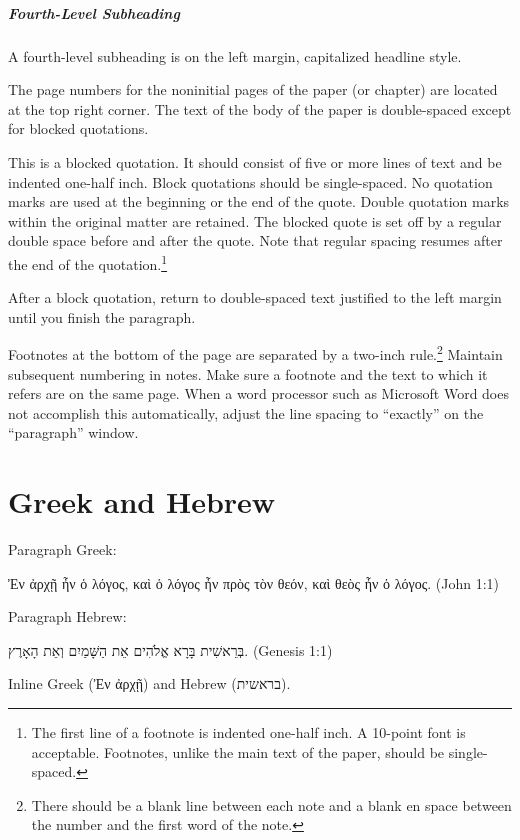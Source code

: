 \documentclass[letterpaper,12pt,oneside,openany]{book}
\begin{document}
\subparagraph{Fourth-Level Subheading}

A fourth-level subheading is on the left margin, capitalized headline style.

The page numbers for the noninitial pages of the paper (or chapter) are
located at the top right corner. The text of the body of the paper is
double-spaced except for blocked
quotations.
\begin{quoting}
  This is a blocked quotation. It should consist of five or more lines of text
  and be indented one-half inch. Block quotations should be single-spaced. No
  quotation marks are used at the beginning or the end of the quote. Double
  quotation marks within the original matter are retained. The blocked quote
  is set off by a regular double space before and after the quote. Note that
  regular spacing resumes after the end of the quotation.\footnote{The first
  line of a footnote is indented one-half inch. A 10-point font is acceptable.
  Footnotes, unlike the main text of the paper, should be single-spaced.}
\end{quoting}
After a block quotation, return to double-spaced text justified to the left
margin until you finish the paragraph.

Footnotes at the bottom of the page are separated by a two-inch
rule.\footnote{There should be a blank line between each note and a blank en
space between the number and the first word of the note.} Maintain subsequent
numbering in notes. Make sure a footnote and the text to which it refers are
on the same page. When a word processor such as Microsoft Word does not
accomplish this automatically, adjust the line spacing to ``exactly'' on the
``paragraph'' window.

\section{Greek and Hebrew}

Paragraph Greek:
\begin{quoting}
  \begin{greek}
    Ἐν ἀρχῇ ἦν ὁ λόγος, καὶ ὁ λόγος ἦν πρὸς τὸν θεόν, καὶ θεὸς ἦν ὁ λόγος.
    \textenglish{(John 1:1)}
  \end{greek}
\end{quoting}
Paragraph Hebrew:
\begin{quoting}
  \begin{hebrew}
    בְּרֵאשִׁית בָּרָא אֱלֹהִים אֵת הַשָּׁמַיִם וְאֵת הָאָרֶץ. \textenglish{(Genesis 1:1)}
  \end{hebrew}
\end{quoting}
Inline Greek (\textgreek{Ἐν ἀρχῇ}) and Hebrew (\texthebrew{בראשית}).
\end{document}
